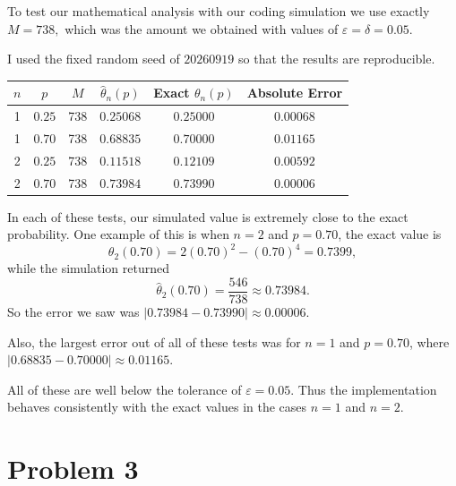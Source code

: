 \documentclass[11pt]{scrartcl}
\begin{document}
\begin{soln}
			
\subsubsection*{}

To test our mathematical analysis with our coding simulation we use exactly
$
M=738,
$
which was the amount we obtained with values of
$
\varepsilon=\delta=0.05.
$

I used the fixed random seed of $
20260919$
so that the results are reproducible.

\begin{center}
	\renewcommand{\arraystretch}{1.25}
	\begin{tabular}{cccccc}
		\toprule
		$n$ & $p$ & $M$
		& $\widehat{\theta}_n(p)$
		& Exact $\theta_n(p)$
		& Absolute Error\\
		\midrule
		
		1 & $0.25$ & 738
		& $0.25068$
		& $0.25000$
		& $0.00068$\\
		
		1 & $0.70$ & 738
		& $0.68835$
		& $0.70000$
		& $0.01165$\\
		
		2 & $0.25$ & 738
		& $0.11518$
		& $0.12109$
		& $0.00592$\\
		
		2 & $0.70$ & 738
		& $0.73984$
		& $0.73990$
		& $0.00006$\\
		
		\bottomrule
	\end{tabular}
\end{center}

In each of these tests, our simulated value is extremely close to the exact probability. One example of this is when $n=2$ and $p=0.70$, the exact value is
\[
\theta_2(0.70)
=
2(0.70)^2-(0.70)^4
=
0.7399,
\]
while the simulation returned
\[
\widehat{\theta}_2(0.70)
=
\frac{546}{738}
\approx
0.73984.
\]
So the error we saw was
$
\left|
0.73984-0.73990
\right|
\approx
0.00006.
$

Also, the largest error out of all of these tests was 
for $n=1$ and $p=0.70$, where
$
\left|
0.68835-0.70000
\right|
\approx
0.01165.
$

All of these are well below the tolerance of
$
\varepsilon=0.05.
$
Thus the implementation behaves consistently with the exact values in
the cases $n=1$ and $n=2$.
			
\end{soln}
		

\newpage
\section{Problem 3}
\end{document}
